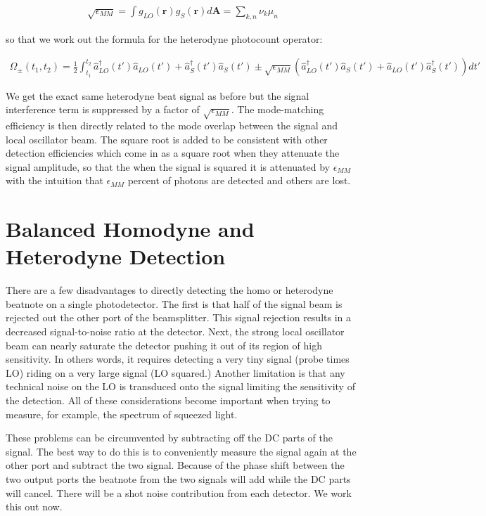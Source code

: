 \documentclass[12pt]{article}
\newcommand{\bv}[1]{\textbf{#1}}
\begin{document}
\begin{align}
\sqrt{\epsilon_{MM}} = \int g_{LO}(\bv{r}) g_S(\bv{r})d\bv{A} = \sum_{k,n}\nu_k \mu_n
\end{align}

so that we work out the formula for the heterodyne photocount operator:

\begin{align}
\hat{\Omega}_{\pm}(t_1,t_2) = \frac{1}{2} \int_{t_1}^{t_2} \hat{a}^{\dag}_{LO}(t') \hat{a}_{LO}(t') + \hat{a}^{\dag}_S(t') \hat{a}_S(t') \pm  \sqrt{\epsilon_{MM}}\left(\hat{a}^{\dag}_{LO}(t') \hat{a}_S(t') + \hat{a}_{LO}(t')\hat{a}^{\dag}_S(t')\right) dt'
\end{align}

We get the exact same heterodyne beat signal as before but the signal interference term is suppressed by a factor of $\sqrt{\epsilon_{MM}}$. The mode-matching efficiency is then directly related to the mode overlap between the signal and local oscillator beam. The square root is added to be consistent with other detection efficiencies which come in as a square root when they attenuate the signal amplitude, so that the when the signal is squared it is attenuated by $\epsilon_{MM}$ with the intuition that $\epsilon_{MM}$ percent of photons are detected and others are lost.


\section{Balanced Homodyne and Heterodyne Detection}
There are a few disadvantages to directly detecting the homo or heterodyne beatnote on a single photodetector. The first is that half of the signal beam is rejected out the other port of the beamsplitter. This signal rejection results in a decreased signal-to-noise ratio at the detector. Next, the strong local oscillator beam can nearly saturate the detector pushing it out of its region of high sensitivity. In others words, it requires detecting a very tiny signal (probe times LO) riding on a very large signal (LO squared.) Another limitation is that any technical noise on the LO is transduced onto the signal limiting the sensitivity of the detection. All of these considerations become important when trying to measure, for example, the spectrum of squeezed light.

These problems can be circumvented by subtracting off the DC parts of the signal. The best way to do this is to conveniently measure the signal again at the other port and subtract the two signal. Because of the phase shift between the two output ports the beatnote from the two signals will add while the DC parts will cancel. There will be a shot noise contribution from each detector. We work this out now.
\end{document}
